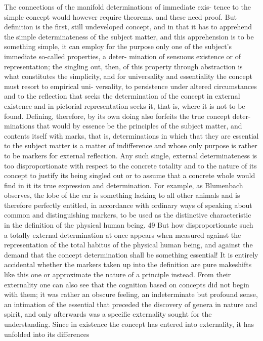 The connections of the manifold determinations of immediate exis-
tence to the simple concept would however require theorems, and these
need proof. But definition is the first, still undeveloped concept, and in
that it has to apprehend the simple determinateness of the subject matter,
and this apprehension is to be something simple, it can employ for the
purpose only one of the subject's immediate so-called properties, a deter-
mination of sensuous existence or of representation; the singling out, then,
of this property through abstraction is what constitutes the simplicity, and
for universality and essentiality the concept must resort to empirical uni-
versality, to persistence under altered circumstances and to the reflection
that seeks the determination of the concept in external existence and in
pictorial representation
seeks it, that is, where it is not to be found.
Defining, therefore, by its own doing also forfeits the true concept deter-
minations that would by essence be the principles of the subject matter,
and contents itself with marks, that is, determinations in which that they
are essential to the subject matter is a matter of indifference and whose
only purpose is rather to be markers for external reflection.
Any such
single, external determinateness is too disproportionate with respect to the
concrete totality and to the nature of its concept to justify its being singled
out or to assume that a concrete whole would find in it its true expression
and determination.
For example, as Blumenbach observes, the lobe of
the ear is something lacking to all other animals and is therefore perfectly
entitled, in accordance with ordinary ways of speaking about common and
distinguishing markers, to be used as the distinctive characteristic in the
definition of the physical human being. 49 But how disproportionate such a
totally external determination at once appears when measured against the
representation of the total habitus of the physical human being, and against
the demand that the concept determination shall be something essential!
It is entirely accidental whether the markers taken up into the definition
are pure makeshifts like this one or approximate the nature of a principle
instead. From their externality one can also see that the cognition based
on concepts did not begin with them; it was rather an obscure feeling,
an indeterminate but profound sense, an intimation of the essential that
preceded the discovery of genera in nature and spirit, and only afterwards
was a specific externality sought for the understanding.
Since in existence
the concept has entered into externality, it has unfolded into its differences
